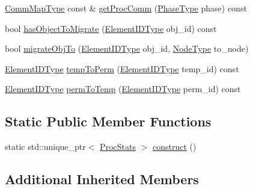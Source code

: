 \begin{DoxyCompactItemize}
\item 
\hyperlink{namespacevt_1_1vrt_1_1collection_1_1balance_aa50d4cbbfa3c643e7303fc6e08f411fb}{Comm\+Map\+Type} const  \& \hyperlink{structvt_1_1vrt_1_1collection_1_1balance_1_1_proc_stats_ad8cda5635a21134657595fd34dca1f6a}{get\+Proc\+Comm} (\hyperlink{namespacevt_a46ce6733d5cdbd735d561b7b4029f6d7}{Phase\+Type} phase) const
\item 
bool \hyperlink{structvt_1_1vrt_1_1collection_1_1balance_1_1_proc_stats_a8ee38def0f38270f9b3dbbae19b027ce}{has\+Object\+To\+Migrate} (\hyperlink{namespacevt_1_1vrt_1_1collection_1_1balance_a14c8d2c972f2913aa3f1636e5be0a120}{Element\+I\+D\+Type} obj\+\_\+id) const
\item 
bool \hyperlink{structvt_1_1vrt_1_1collection_1_1balance_1_1_proc_stats_ad8a4cff0e1259002ed45b5c8f1b43d26}{migrate\+Obj\+To} (\hyperlink{namespacevt_1_1vrt_1_1collection_1_1balance_a14c8d2c972f2913aa3f1636e5be0a120}{Element\+I\+D\+Type} obj\+\_\+id, \hyperlink{namespacevt_a866da9d0efc19c0a1ce79e9e492f47e2}{Node\+Type} to\+\_\+node)
\item 
\hyperlink{namespacevt_1_1vrt_1_1collection_1_1balance_a14c8d2c972f2913aa3f1636e5be0a120}{Element\+I\+D\+Type} \hyperlink{structvt_1_1vrt_1_1collection_1_1balance_1_1_proc_stats_afed5b2ba3c677167d38ae12c012ff993}{temp\+To\+Perm} (\hyperlink{namespacevt_1_1vrt_1_1collection_1_1balance_a14c8d2c972f2913aa3f1636e5be0a120}{Element\+I\+D\+Type} temp\+\_\+id) const
\item 
\hyperlink{namespacevt_1_1vrt_1_1collection_1_1balance_a14c8d2c972f2913aa3f1636e5be0a120}{Element\+I\+D\+Type} \hyperlink{structvt_1_1vrt_1_1collection_1_1balance_1_1_proc_stats_a5b3d280cadc1a2d06de37b5d2da41ba8}{perm\+To\+Temp} (\hyperlink{namespacevt_1_1vrt_1_1collection_1_1balance_a14c8d2c972f2913aa3f1636e5be0a120}{Element\+I\+D\+Type} perm\+\_\+id) const
\end{DoxyCompactItemize}
\subsection*{Static Public Member Functions}
\begin{DoxyCompactItemize}
\item 
static std\+::unique\+\_\+ptr$<$ \hyperlink{structvt_1_1vrt_1_1collection_1_1balance_1_1_proc_stats}{Proc\+Stats} $>$ \hyperlink{structvt_1_1vrt_1_1collection_1_1balance_1_1_proc_stats_a2589f33e27eee819d91eb2c91816d34b}{construct} ()
\end{DoxyCompactItemize}
\subsection*{Additional Inherited Members}


